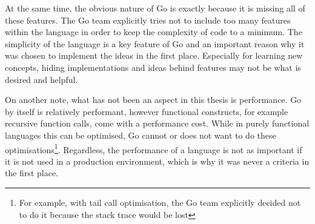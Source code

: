 At the same time, the obvious nature of Go is exactly because it is missing all
of these features. The Go team explicitly tries not to include too many features within
the language in order to keep the complexity of code to a minimum\autocite{go-feature}.
The simplicity of the language is a key feature of Go and an important reason why it was
chosen to implement the ideas in the first place.
Especially for learning new concepts, hiding implementations and ideas behind features
may not be what is desired and helpful.

On another note, what has not been an aspect in this thesis is
performance. Go by itself is relatively performant, however functional constructs, for example
recursive function calls, come with a performance cost. While in purely functional languages
this can be optimised, Go cannot or does not want to do these optimisations\footnote{For example,
with tail call optimisation, the Go team explicitly decided not to do it because the stack trace
would be lost}. Regardless, the performance of a language is not as important if it
is not used in a production environment, which is why it was never a criteria in the first place.
